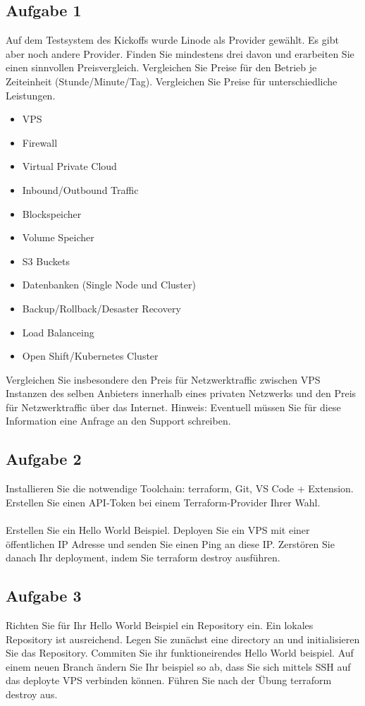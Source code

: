 \documentclass{article}
\begin{document}
    \subsection{Aufgabe 1}
    Auf dem Testsystem des Kickoffs wurde Linode als Provider gewählt.
    Es gibt aber noch andere Provider. Finden Sie mindestens drei davon und erarbeiten Sie einen sinnvollen Preisvergleich.
    Vergleichen Sie Preise für den Betrieb je Zeiteinheit (Stunde/Minute/Tag). Vergleichen Sie Preise für unterschiedliche Leistungen.
    \begin{itemize}
        \item VPS
        \item Firewall
        \item Virtual Private Cloud
        \item Inbound/Outbound Traffic
        \item Blockspeicher
        \item Volume Speicher
        \item S3 Buckets
        \item Datenbanken (Single Node und Cluster)
        \item Backup/Rollback/Desaster Recovery
        \item Load Balanceing
        \item Open Shift/Kubernetes Cluster
    \end{itemize}
    Vergleichen Sie insbesondere den Preis für Netzwerktraffic zwischen VPS Instanzen des selben Anbieters innerhalb eines privaten Netzwerks
    und den Preis für Netzwerktraffic über das Internet. Hinweis: Eventuell müssen Sie für diese  Information eine Anfrage an den Support schreiben.

    \subsection{Aufgabe 2}
    Installieren Sie die notwendige Toolchain: terraform, Git, VS Code + Extension.
    Erstellen Sie einen API‑Token bei einem Terraform‑Provider Ihrer Wahl.
    \\ \\
    Erstellen Sie ein Hello World Beispiel. Deployen Sie ein VPS mit einer öffentlichen IP Adresse und senden Sie einen Ping an diese IP.
    Zerstören Sie danach Ihr deployment, indem Sie terraform destroy ausführen.

    \subsection{Aufgabe 3}
    Richten Sie für Ihr Hello World Beispiel ein Repository ein. Ein lokales Repository ist ausreichend.
    Legen Sie zunächst eine directory an und initialisieren Sie das Repository. Commiten Sie ihr funktioneirendes Hello World beispiel.
    Auf einem neuen Branch ändern Sie Ihr beispiel so ab, dass Sie sich mittels SSH auf das deployte VPS verbinden können. Führen Sie nach der Übung terraform destroy aus.
\end{document}
